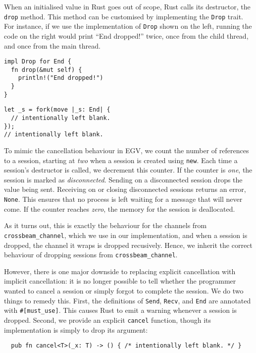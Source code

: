 \documentclass[copyright,creativecommons]{eptcs}
\begin{document}
When an initialised value in Rust goes out of scope, Rust calls its destructor, the \lstinline{drop} method. This method can be customised by implementing the \lstinline{Drop} trait. For instance, if we use the implementation of \lstinline{Drop} shown on the left, running the code on the right would print ``End dropped!'' twice, once from the child thread, and once from the main thread.

\vspace{-0.5\baselineskip}
\begin{minipage}[t]{0.5\linewidth}
\begin{lstlisting}
impl Drop for End {
  fn drop(&mut self) {
    println!("End dropped!")
  }
}
\end{lstlisting}
\end{minipage}%
\begin{minipage}[t]{0.5\linewidth}
\begin{lstlisting}
let _s = fork(move |_s: End| {
  // intentionally left blank.
});
// intentionally left blank.
\end{lstlisting}
\end{minipage}

\noindent
To mimic the cancellation behaviour in EGV, we count the number of references to a session, starting at \emph{two} when a session is created using \lstinline{new}. Each time a session's destructor is called, we decrement this counter. If the counter is \emph{one}, the session is marked as \emph{disconnected}. Sending on a disconnected session drops the value being sent. Receiving on or closing disconnected sessions returns an error, \ie \lstinline{None}. This ensures that no process is left waiting for a message that will never come. If the counter reaches \emph{zero}, the memory for the session is deallocated.

As it turns out, this is exactly the behaviour for the channels from \lstinline{crossbeam_channel}, which we use in our implementation, and when a session is dropped, the channel it wraps is dropped recusively. Hence, we inherit the correct behaviour of dropping sessions from \lstinline{crossbeam_channel}.

However, there is one major downside to replacing explicit cancellation with implicit cancellation: it is no longer possible to tell whether the programmer wanted to cancel a session or simply forgot to complete the session. We do two things to remedy this. First, the definitions of \lstinline{Send}, \lstinline{Recv}, and \lstinline{End} are annotated with \lstinline{#[must_use]}. This causes Rust to emit a warning whenever a session is dropped. Second, we provide an explicit \lstinline{cancel} function, though its implementation is simply to drop its argument:
\begin{lstlisting}
  pub fn cancel<T>(_x: T) -> () { /* intentionally left blank. */ }
\end{lstlisting}
\end{document}
